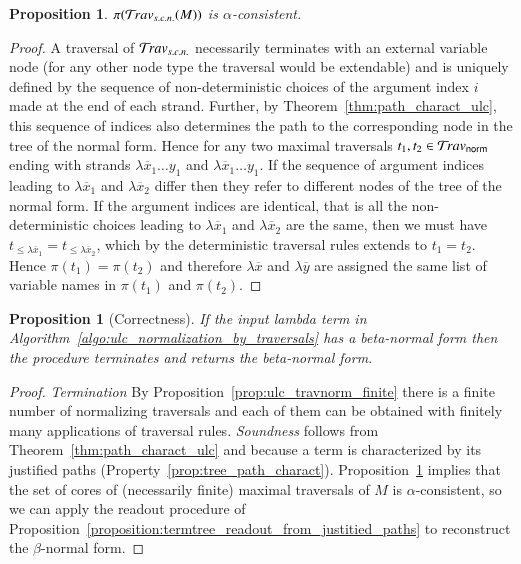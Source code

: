\documentclass{elsarticle}
\theoremstyle{plain}
\newtheorem{proposition}[theorem]{Proposition}
\theoremstyle{definition}
\newcommand{\normalizing}{{\sf norm}}
\newcommand{\travsetnorm}{\travset_\normalizing} %
\newcommand{\travsetscn}{\travset_{s.c.n.}} %
\def\coresymbol{\pi} %
\newcommand{\core}[1]{\coresymbol(#1)} %
\begin{document}
\begin{proposition}
    \label{prop:core_travsetnorm_alpha_consistent}
    $\core{\travsetscn(M)}$ is $\alpha$-consistent.
\end{proposition}
\begin{proof}
A traversal of $\travsetscn$
necessarily terminates with an external variable node (for any other node type the traversal would be extendable) and
is uniquely defined by the sequence of non-deterministic choices of the argument index $i$ made at the end of each strand. Further, by Theorem~\ref{thm:path_charact_ulc}, this sequence of indices also determines the path to the corresponding node in the tree of the normal form.
Hence for any two maximal traversals $t_1,t_2 \in \travsetnorm$
ending with strands $\lambda\overline{x}_1 \ldots y_1$ and
$\lambda\overline{x}_1 \ldots y_1$.
If the sequence of argument indices leading to $\lambda\overline{x}_1$ and $\lambda\overline{x}_2$ differ then they refer to different nodes of the tree of the normal form.
If the argument indices are identical, that is all the non-deterministic choices leading to $\lambda\overline{x}_1$ and $\lambda\overline{x}_2$ are the same, then we must have $t_{\leq \lambda\overline{x}_1} = t_{\leq \lambda\overline{x}_2}$, which by the deterministic
traversal rules extends to $t_1 = t_2$.
Hence $\core{t_1} = \core{t_2}$ and therefore $\lambda\overline{x}$
and $\lambda\overline{y}$ are assigned the same list of variable names in
$\core{t_1}$ and $\core{t_2}$.
\end{proof}

\begin{proposition}[Correctness]
    If the input lambda term in Algorithm~\ref{algo:ulc_normalization_by_traversals} has a beta-normal form then
    the procedure terminates and returns the beta-normal form.
\end{proposition}
\begin{proof}
\emph{Termination}  By Proposition~\ref{prop:ulc_travnorm_finite} there is a finite number of normalizing traversals and each of them can be obtained with finitely many applications of traversal rules.
%
\emph{Soundness} follows from Theorem~\ref{thm:path_charact_ulc} and because a term is  characterized by its justified paths (Property~\ref{prop:tree_path_charact}).
Proposition~\ref{prop:core_travsetnorm_alpha_consistent}
implies that
the set of cores of (necessarily finite) maximal traversals of $M$
is $\alpha$-consistent, so we can
apply the readout procedure of Proposition~\ref{proposition:termtree_readout_from_justitied_paths} to
reconstruct the $\beta$-normal form.
\end{proof}
\end{document}
